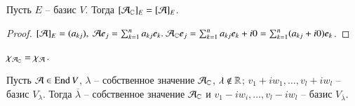 \documentclass[main]{subfiles}
\begin{document}
\begin{proposition}
    Пусть $E$ -- базис $V$. Тогда $[\mathcal{A}_{\mathbb{C}}]_E = [\mathcal{A}]_E$.
\end{proposition}

\begin{proof}
    $[\mca]_E = (a_{kj}), \ \mca e_j = \sum_{k=1}^n a_{kj} e_k. \ \mca_{\C}e_j = \sum_{k=1}^{n}a_{kj}e_k + i0 = \sum_{k=1}^n(a_{kj} + i0)e_k$.
\end{proof}

\begin{corollary}
    $\chi_{\mathcal{A}_{\mathbb{C}}} = \chi_{\mathcal{A}}$.
\end{corollary}

\begin{proposition}
    Пусть $\mathcal{A} \in \operatorname{End} V$, $\lambda$ -- собственное значение $\mathcal{A}_{\mathbb{C}}$, $\lambda \not\in \mathbb{R}$;
    $v_1+iw_1, \ldots, v_l+iw_l$ -- базис $V_{\lambda}$. Тогда $\overline{\lambda}$ -- собственное 
    значение $\mathcal{A}_{\mathbb{C}}$ и $v_1-iw_i, \ldots, v_l-iw_l$ -- базис $V_{\overline{\lambda}}$.
\end{proposition}
\end{document}
